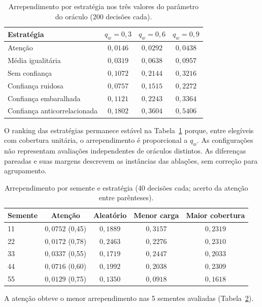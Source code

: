 \documentclass[12pt,openany,oneside,a4paper,brazil,chapter=TITLE]{abntex2}
\begin{document}
\begin{table}[htbp]
\fontsize{10}{12}\selectfont\SingleSpacing
\centering
\caption{Arrependimento por estratégia nos três valores do parâmetro do oráculo (200 decisões cada).}
\label{tab:mundos}
\begin{tabular}{lccc}
\toprule
Estratégia & $q_w=0{,}3$ & $q_w=0{,}6$ & $q_w=0{,}9$ \\
\midrule
Atenção & $0{,}0146$ & $0{,}0292$ & $0{,}0438$ \\
Média igualitária & $0{,}0319$ & $0{,}0638$ & $0{,}0957$ \\
Sem confiança & $0{,}1072$ & $0{,}2144$ & $0{,}3216$ \\
Confiança ruidosa & $0{,}0757$ & $0{,}1515$ & $0{,}2272$ \\
Confiança embaralhada & $0{,}1121$ & $0{,}2243$ & $0{,}3364$ \\
Confiança anticorrelacionada & $0{,}1802$ & $0{,}3604$ & $0{,}5406$ \\
\bottomrule
\end{tabular}
\end{table}
O ranking das estratégias permanece estável na Tabela~\ref{tab:mundos} porque, entre elegíveis com cobertura unitária, o arrependimento é proporcional a $q_w$. As configurações não representam avaliações independentes de oráculos distintos. As diferenças pareadas e suas margens descrevem as instâncias das ablações, sem correção para agrupamento.
\begin{table}[htbp]
\fontsize{10}{12}\selectfont\SingleSpacing
\centering
\caption{Arrependimento por semente e estratégia (40 decisões cada; acerto da atenção entre parênteses).}
\label{tab:seeds}
\begin{tabular}{lcccc}
\toprule
Semente & Atenção & Aleatório & Menor carga & Maior cobertura \\
\midrule
11 & $0{,}0752$ (0,45) & $0{,}1889$ & $0{,}3157$ & $0{,}2319$ \\
22 & $0{,}0172$ (0,78) & $0{,}2463$ & $0{,}2276$ & $0{,}2310$ \\
33 & $0{,}0337$ (0,55) & $0{,}1719$ & $0{,}2447$ & $0{,}2033$ \\
44 & $0{,}0716$ (0,60) & $0{,}1992$ & $0{,}2038$ & $0{,}2309$ \\
55 & $0{,}0129$ (0,75) & $0{,}1350$ & $0{,}0918$ & $0{,}1618$ \\
\bottomrule
\end{tabular}
\end{table}
A atenção obteve o menor arrependimento nas 5 sementes avaliadas (Tabela~\ref{tab:seeds}).
\end{document}
